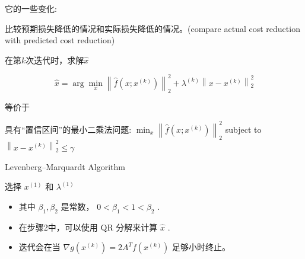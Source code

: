 它的一些变化:

\begin{example}
    比较预期损失降低的情况和实际损失降低的情况。(compare actual cost reduction with predicted cost reduction)
\end{example}

\begin{theorem}
    在第$k$次迭代时，求解$\hat{x}$

    \begin{equation}
    \hat{x}=\arg \min _{x}\left\|\hat{f}\left(x ; x^{(k)}\right)\right\|_{2}^{2}+\lambda^{(k)}\left\|x-x^{(k)}\right\|_{2}^{2}
    \end{equation}

    等价于

    具有“置信区间”的最小二乘法问题:
    $ \min _{x}\left\|\hat{f}\left(x ; x^{(k)}\right)\right\|_{2}^{2} $
    subject to $ \left\|x-x^{(k)}\right\|_{2}^{2} \leq \gamma $
\end{theorem}


\begin{algorithm}[htbp]
    \caption{Levenberg–Marquardt Algorithm}
    选择 $ x^{(1)} $ 和 $ \lambda^{(1)} $\;
\end{algorithm}

\begin{itemize}
    \item 其中 $ \beta_{1}, \beta_{2} $ 是常数， $ 0<\beta_{1}<1<\beta_{2} $ .
    \item 在步骤2中，可以使用 $ \mathrm{QR} $ 分解来计算 $ \hat{x} $ .
    \item 迭代会在当 $ \nabla g\left(x^{(k)}\right)=2 A^{T} f\left(x^{(k)}\right) $ 足够小时终止。
\end{itemize}


